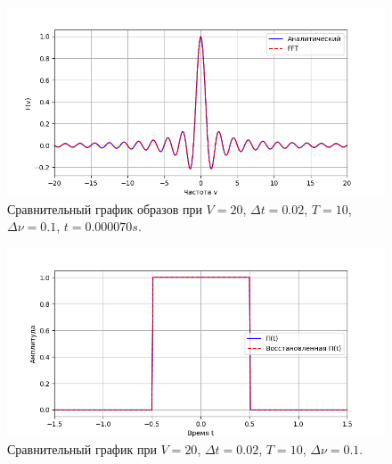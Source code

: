 \documentclass[a4paper]{article}
\begin{document}
\begin{figure}[H]
  \centering
  \includegraphics[width=\textwidth]{src/task_1_4/freq_10_0.01_20_0.1.png}
  \caption{Сравнительный график образов при $V=20$, $\Delta t=0.02$, $T=10$, $\Delta \nu=0.1$, $t=0.000070 s$.} 
\end{figure}
\begin{figure}[H]
  \centering
  \includegraphics[width=\textwidth]{src/task_1_4/time_10_0.01_20_0.1.png}
  \caption{Сравнительный график при $V=20$, $\Delta t=0.02$, $T=10$, $\Delta \nu=0.1$.} 
\end{figure}
\end{document}
